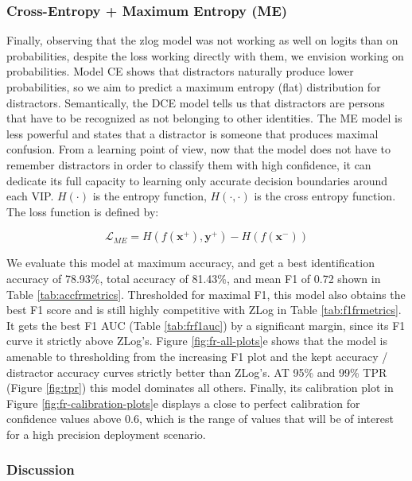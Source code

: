 \subsubsection{Cross-Entropy + Maximum Entropy (ME)}

Finally, observing that the zlog model was not working as well on logits than on probabilities, despite the loss working directly with them, we envision working on probabilities. Model CE shows that distractors naturally produce lower probabilities, so we aim to predict a maximum entropy (flat) distribution for distractors. Semantically, the DCE model tells us that distractors are persons that have to be recognized as not belonging to other identities. The ME model is less powerful and states that a distractor is someone that produces maximal confusion. From a learning point of view, now that the model does not have to remember distractors in order to classify them with high confidence, it can dedicate its full capacity to learning only accurate decision boundaries around each VIP. $H(\cdot)$ is the entropy function, $H(\cdot, \cdot)$ is the cross entropy function.  The loss function is defined by:

\begin{equation}
    \mathcal{L}_{ME} = H(f(\mathbf{x}^+), \mathbf{y}^+) - H(f(\mathbf{x}^-))
\end{equation}

We evaluate this model at maximum accuracy, and get a best identification accuracy of 78.93\%, total accuracy of 81.43\%, and mean F1 of 0.72 shown in Table \ref{tab:accfrmetrics}. Thresholded for maximal F1, this model also obtains the best F1 score and is still highly competitive with ZLog in Table \ref{tab:f1frmetrics}. It gets the best F1 AUC (Table \ref{tab:frf1auc}) by a significant margin, since its F1 curve it strictly above ZLog's. Figure \ref{fig:fr-all-plots}e shows that the model is amenable to thresholding from the increasing F1 plot and the kept accuracy / distractor accuracy curves strictly better than ZLog's. AT 95\% and 99\% \ac{TPR} (Figure \ref{fig:tpr}) this model dominates all others. Finally, its calibration plot in Figure \ref{fig:fr-calibration-plots}e displays a close to perfect calibration for confidence values above 0.6, which is the range of values that will be of interest for a high precision deployment scenario.

\subsubsection{Discussion}

